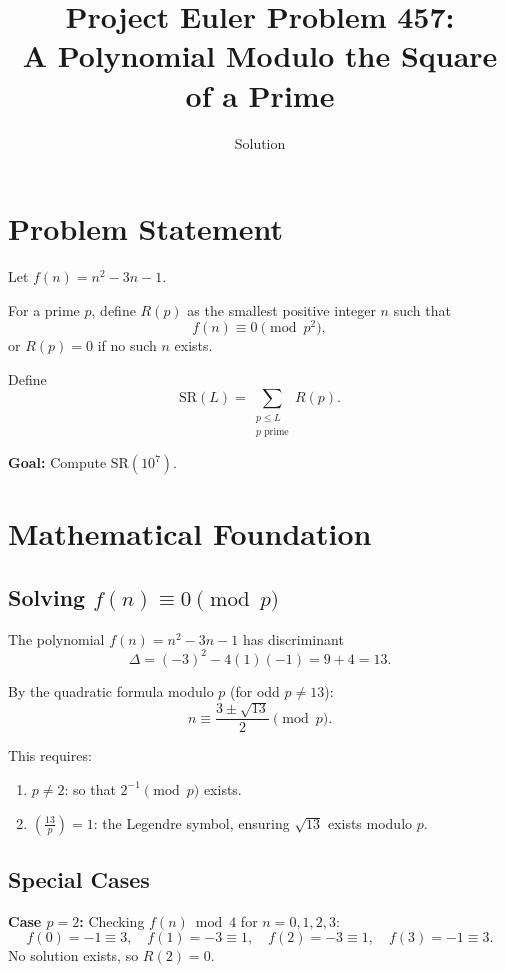 \documentclass[11pt]{article}
\title{Project Euler Problem 457:\\A Polynomial Modulo the Square of a Prime}
\author{Solution}
\date{}
\begin{document}
\maketitle

\section{Problem Statement}

Let $f(n) = n^2 - 3n - 1$.

For a prime $p$, define $R(p)$ as the smallest positive integer $n$ such that
\[
f(n) \equiv 0 \pmod{p^2},
\]
or $R(p) = 0$ if no such $n$ exists.

Define
\[
\text{SR}(L) = \sum_{\substack{p \leq L \\ p \text{ prime}}} R(p).
\]

\textbf{Goal:} Compute $\text{SR}(10^7)$.

\section{Mathematical Foundation}

\subsection{Solving $f(n) \equiv 0 \pmod{p}$}

The polynomial $f(n) = n^2 - 3n - 1$ has discriminant
\[
\Delta = (-3)^2 - 4(1)(-1) = 9 + 4 = 13.
\]

By the quadratic formula modulo $p$ (for odd $p \neq 13$):
\[
n \equiv \frac{3 \pm \sqrt{13}}{2} \pmod{p}.
\]

This requires:
\begin{enumerate}
    \item $p \neq 2$: so that $2^{-1} \pmod{p}$ exists.
    \item $\left(\frac{13}{p}\right) = 1$: the Legendre symbol, ensuring $\sqrt{13}$ exists modulo $p$.
\end{enumerate}

\subsection{Special Cases}

\textbf{Case $p = 2$:}
Checking $f(n) \bmod 4$ for $n = 0, 1, 2, 3$:
\[
f(0) = -1 \equiv 3,\quad f(1) = -3 \equiv 1,\quad f(2) = -3 \equiv 1,\quad f(3) = -1 \equiv 3.
\]
No solution exists, so $R(2) = 0$.
\end{document}
